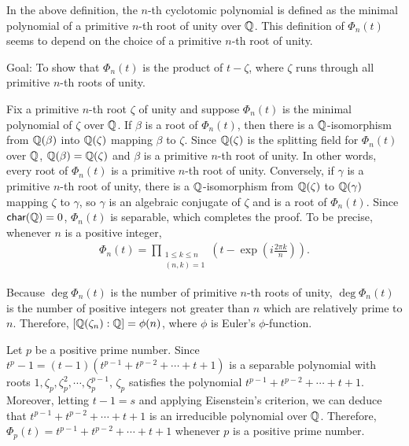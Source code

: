 \begin{rmk}
    In the above definition, the $n$-th cyclotomic polynomial is defined as the minimal polynomial of a primitive $n$-th root of unity over ${\mathbb{Q}}$.
    This definition of $\Phi_n(t)$ seems to depend on the choice of a primitive $n$-th root of unity.
    \begin{center}
        Goal: To show that $\Phi_n(t)$ is the product of $t-\zeta$, where $\zeta$ runs through all primitive $n$-th roots of unity.
    \end{center}
    
    Fix a primitive $n$-th root $\zeta$ of unity and suppose $\Phi_n(t)$ is the minimal polynomial of $\zeta$ over ${\mathbb{Q}}$.
    If $\beta$ is a root of $\Phi_n(t)$, then there is a ${\mathbb{Q}}$-isomorphism from ${\mathbb{Q}}(\beta)$ into ${\mathbb{Q}}(\zeta)$ mapping $\beta$ to $\zeta$.
    Since ${\mathbb{Q}}(\zeta)$ is the splitting field for $\Phi_n(t)$ over ${\mathbb{Q}}$, ${\mathbb{Q}}(\beta)={\mathbb{Q}}(\zeta)$ and $\beta$ is a primitive $n$-th root of unity.
    In other words, every root of $\Phi_n(t)$ is a primitive $n$-th root of unity.
    Conversely, if $\gamma$ is a primitive $n$-th root of unity, there is a ${\mathbb{Q}}$-isomorphism from ${\mathbb{Q}}(\zeta)$ to ${\mathbb{Q}}(\gamma)$ mapping $\zeta$ to $\gamma$, so $\gamma$ is an algebraic conjugate of $\zeta$ and is a root of $\Phi_n(t)$.
    Since ${\textsf{char}({{\mathbb{Q}}})}=0$, $\Phi_n(t)$ is separable, which completes the proof.
    To be precise, whenever $n$ is a positive integer,
    \begin{align*}
        \Phi_n(t)=\prod_{\substack{1\leq k\leq n\\(n, k)=1}}\left(t-\exp\left(i\frac{2\pi k}{n}\right)\right).
    \end{align*}

    Because $\deg\Phi_n(t)$ is the number of primitive $n$-th roots of unity, $\deg\Phi_n(t)$ is the number of positive integers not greater than $n$ which are relatively prime to $n$.
    Therefore, $[{\mathbb{Q}}(\zeta_n):{\mathbb{Q}}]=\phi(n)$, where $\phi$ is Euler's $\phi$-function.
\end{rmk}
\begin{exmp}
    Let $p$ be a positive prime number.
    Since $t^p-1=(t-1)(t^{p-1}+t^{p-2}+\cdots+t+1)$ is a separable polynomial with roots $1, \zeta_p, \zeta_p^2, \cdots, \zeta_p^{p-1}$, $\zeta_p$ satisfies the polynomial $t^{p-1}+t^{p-2}+\cdots+t+1$.
    Moreover, letting $t-1=s$ and applying Eisenstein's criterion, we can deduce that $t^{p-1}+t^{p-2}+\cdots+t+1$ is an irreducible polynomial over ${\mathbb{Q}}$.
    Therefore, $\Phi_p(t)=t^{p-1}+t^{p-2}+\cdots+t+1$ whenever $p$ is a positive prime number.
\end{exmp}
